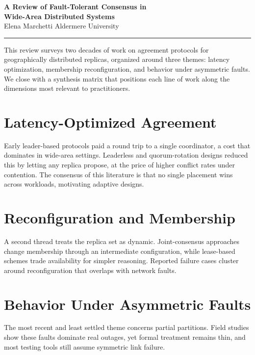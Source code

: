 \documentclass[11pt]{article}
\begin{document}
\begin{center}
  {\LARGE\bfseries A Review of Fault-Tolerant Consensus in\\ Wide-Area Distributed Systems}\\[0.4em]
  {\normalsize Elena Marchetti \quad\textbullet\quad Aldermere University}\\[0.3em]
  {\small\color{accent}\rule{0.35\textwidth}{0.8pt}}
\end{center}

\vspace{0.3em}
This review surveys two decades of work on agreement protocols for
geographically distributed replicas, organized around three themes: latency
optimization, membership reconfiguration, and behavior under asymmetric faults.
We close with a synthesis matrix that positions each line of work along the
dimensions most relevant to practitioners.

\section{Latency-Optimized Agreement}
Early leader-based protocols paid a round trip to a single coordinator, a cost
that dominates in wide-area settings. Leaderless and quorum-rotation designs
reduced this by letting any replica propose, at the price of higher conflict
rates under contention. The consensus of this literature is that no single
placement wins across workloads, motivating adaptive designs.

\section{Reconfiguration and Membership}
A second thread treats the replica set as dynamic. Joint-consensus approaches
change membership through an intermediate configuration, while lease-based
schemes trade availability for simpler reasoning. Reported failure cases
cluster around reconfiguration that overlaps with network faults.

\section{Behavior Under Asymmetric Faults}
The most recent and least settled theme concerns partial partitions. Field
studies show these faults dominate real outages, yet formal treatment remains
thin, and most testing tools still assume symmetric link failure.
\end{document}

